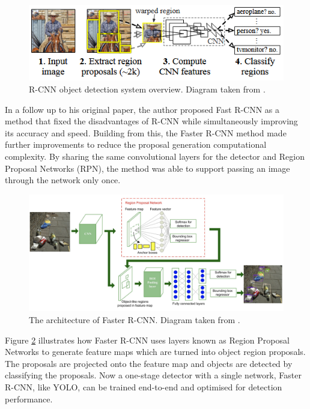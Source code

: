 \documentclass{thesis}
\begin{document}
\begin{figure}[h]
    \centering
    \includegraphics[scale=0.75]{images/rcnn.png}
    \caption{R-CNN object detection system overview. Diagram taken from \cite{rcnn}.}
    \label{fig:faster-rcnn-architecture}
\end{figure}

In a follow up to his original paper, the author proposed Fast R-CNN as a method that fixed the disadvantages of R-CNN while simultaneously improving its accuracy and speed\cite{fast-rcnn}. Building from this, the Faster R-CNN method made further improvements to reduce the proposal generation computational complexity. By sharing the same convolutional layers for the detector and Region Proposal Networks (RPN), the method was able to support passing an image through the network only once\cite{frcnn}.

\begin{figure}[h]
    \centering
    \includegraphics[scale=0.5]{images/faster-rcnn-architecture.png}
    \caption{The architecture of Faster R-CNN. Diagram taken from \cite{smart-street}.}
    \label{fig:faster-rcnn-architecture}
\end{figure}

Figure \ref{fig:faster-rcnn-architecture} illustrates how Faster R-CNN uses layers known as Region Proposal Networks to generate feature maps which are turned into object region proposals. The proposals are projected onto the feature map and objects are detected by classifying the proposals. Now a one-stage detector with a single network, Faster R-CNN, like YOLO\cite{yolov1}, can be trained end-to-end and optimised for detection performance.
\end{document}
